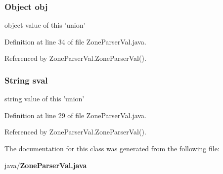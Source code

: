 \subsubsection[{obj}]{\setlength{\rightskip}{0pt plus 5cm}Object obj}\label{classorg_1_1smallfoot_1_1parser_1_1zone_1_1ZoneParserVal_a3a6f22968f6ad522baa85c809b856bae}


object value of this 'union' 



Definition at line 34 of file Zone\-Parser\-Val.\-java.



Referenced by Zone\-Parser\-Val.\-Zone\-Parser\-Val().

\subsubsection[{sval}]{\setlength{\rightskip}{0pt plus 5cm}String sval}\label{classorg_1_1smallfoot_1_1parser_1_1zone_1_1ZoneParserVal_a277083a86232087ccdbaa1f691f3a3ff}


string value of this 'union' 



Definition at line 29 of file Zone\-Parser\-Val.\-java.



Referenced by Zone\-Parser\-Val.\-Zone\-Parser\-Val().



The documentation for this class was generated from the following file\-:\begin{DoxyCompactItemize}
\item 
java/{\bf Zone\-Parser\-Val.\-java}\end{DoxyCompactItemize}

